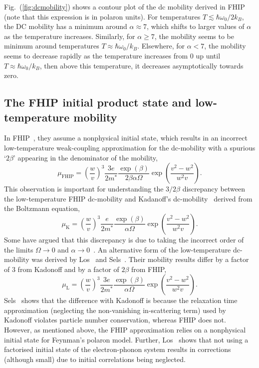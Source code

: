 Fig.~(\ref{fig:dcmobility}) shows a contour plot of the dc mobility derived in FHIP (note that this expression is in polaron units). For temperatures $T \lesssim \hbar \omega_0 / 2 k_B$, the DC mobility has a minimum around $\alpha \approx 7$, which shifts to larger values of $\alpha$ as the temperature increases. Similarly, for $\alpha \geq 7$, the mobility seems to be minimum around temperatures $T \approx \hbar \omega_0 / k_B$. Elsewhere, for $\alpha < 7$, the mobility seems to decrease rapidly as the temperature increases from $0$ up until $T \approx \hbar \omega_0 / k_B$, then above this temperature, it decreases asymptotically towards zero.

\subsection{The FHIP initial product state and low-temperature mobility}

In FHIP~\cite{feynman_mobility_1962}, they assume a nonphysical initial state, which results in an incorrect low-temperature weak-coupling approximation for the dc-mobility with a spurious `$2\beta$' appearing in the denominator of the mobility,
\begin{equation}
    \mu_{\text{FHIP}} = \left( \frac{w}{v} \right)^3 \frac{3e}{2 m^*} \frac{\exp(\beta)}{2\beta \alpha \Omega} \exp\left(\frac{v^2-w^2}{w^2 v}\right).
\end{equation}
This observation is important for understanding the $3/2\beta$ discrepancy between the low-temperature FHIP dc-mobility and Kadanoff's dc-mobility~\cite{kadanoff_boltzmann_1963} derived from the Boltzmann equation,
\begin{equation}
    \mu_{\text{K}} = \left(\frac{w}{v}\right)^3 \frac{e}{2 m^*} \frac{\exp(\beta)}{\alpha \Omega} \exp\left(\frac{v^2 - w^2}{w^2 v}\right).
\end{equation}
Some have argued that this discrepancy is due to taking the incorrect order of the limits $\Omega \to 0$ and $\alpha \to 0$~\cite{peeters_impedance_1983}. An alternative form of the low-temperature dc-mobility was derived by Los~\cite{los_theory_1984, los_influence_2017, los_evolution_2018} and Sels~\cite{sels_dynamic_2016}. Their mobility results differ by a factor of $3$ from Kadonoff and by a factor of $2\beta$ from FHIP,
\begin{equation}
    \mu_{\text{L}} = \left(\frac{w}{v}\right)^3 \frac{3 e}{2 m^*} \frac{\exp(\beta)}{\alpha \Omega} \exp\left(\frac{v^2 - w^2}{w^2 v}\right).
\end{equation}
Sels~\cite{sels_dynamic_2016} shows that the difference with Kadonoff is because the relaxation time approximation (neglecting the non-vanishing in-scattering term) used by Kadonoff violates particle number conservation, whereas FHIP does not. However, as mentioned above, the FHIP approximation relies on a nonphysical initial state for Feynman's polaron model. 
Further, Los~\cite{los_influence_2017, los_evolution_2018} shows that not using a factorised initial state of the electron-phonon system results in corrections (although small) due to initial correlations being neglected.

